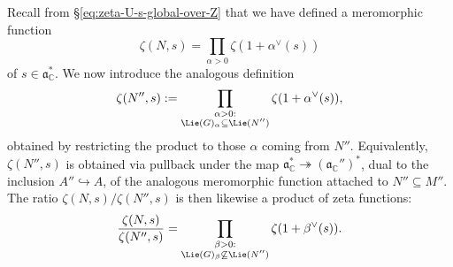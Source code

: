 Recall from \S\ref{eq:zeta-U-s-global-over-Z} that we have defined a meromorphic function
\begin{equation*}
  \zeta(N,s) = \prod_{\alpha > 0} \zeta(1 + \alpha^\vee(s))
\end{equation*}
of $s \in \mathfrak{a}_{\mathbb{C}}^*$.  We now introduce the analogous definition
\begin{equation*}
  \zeta(N'',s) := \prod_{
    \substack{
      \alpha > 0 :  \\
      \Lie(G)_\alpha \subseteq \Lie(N'')
    }
  }
  \zeta(1 + \alpha^\vee(s)),
\end{equation*}
obtained by restricting the product to those $\alpha$ coming from $N''$.  Equivalently, $\zeta(N'',s)$ is obtained via pullback under the map $\mathfrak{a}_{\mathbb{C}}^* \twoheadrightarrow (\mathfrak{a}_{\mathbb{C} }'')^*$, dual to the inclusion $A'' \hookrightarrow A$, of the analogous meromorphic function attached to $N'' \subseteq M''$.  The ratio $\zeta(N,s) / \zeta(N'', s)$ is then likewise a product of zeta functions:
\begin{equation*}
  \frac{\zeta (N, s)}{ \zeta (N'', s)}
  = \prod_{
    \substack{
      \beta > 0:   \\
      \Lie(G)_\beta \not\subseteq \Lie(N'')
    }
  }
  \zeta(1 + \beta^\vee(s)).
\end{equation*}


